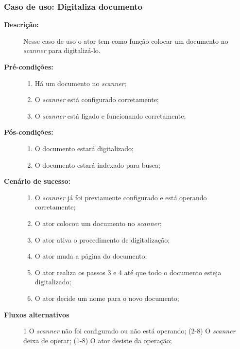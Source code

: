 \subsubsection{Caso de uso: Digitaliza documento}
\begin{description}
    \item[{\bf Descrição:}] Nesse caso de uso o ator tem como função colocar um documento no {\it scanner} para digitalizá-lo.
    \item[{\bf Pré-condições:}]
        \begin{enumerate}
            \item Há um documento no {\it scanner};
            \item O {\it scanner} está configurado corretamente;
            \item O {\it scanner} está ligado e funcionando corretamente;
        \end{enumerate}
    \item[{\bf Pós-condições:}] 
        \begin{enumerate}
            \item O documento estará digitalizado;
            \item O documento estará indexado para busca;
        \end{enumerate}

    \item[{\bf Cenário de sucesso:}]
        \begin{enumerate}
            \item O {\it scanner} já foi previamente configurado e está operando corretamente;
            \item O ator colocou um documento no {\it scanner};
            \item O ator ativa o procedimento de digitalização;
            \item O ator muda a página do documento;
            \item O ator realiza os passos 3 e 4 até que todo o documento esteja digitalizado;
            \item O ator decide um nome para o novo documento;
        \end{enumerate}

    \item[{\bf Fluxos alternativos}]
        1 O {\it scanner} não foi configurado ou não está operando; \newline
        (2-8) O {\it scanner} deixa de operar; \newline
        (1-8) O ator desiste da operação; \newline

\end{description}



